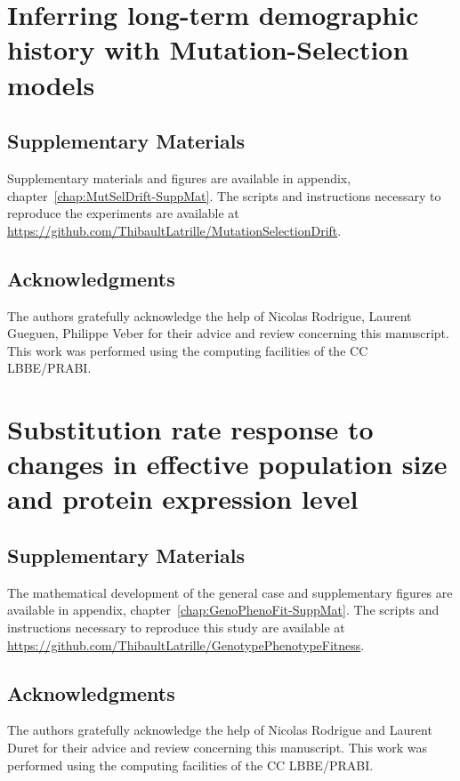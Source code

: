 \documentclass[a4paper,oneside,nobind]{thesis}
\begin{document}
\chapter[Inferring long-term population size] {Inferring long-term demographic history with Mutation-Selection models}
{\hypersetup{linkcolor=GREYDARK}\minitoc}
\label{chap:MutSelDrift}


\section{Supplementary Materials}
Supplementary materials and figures are available in appendix, chapter~\ref{chap:MutSelDrift-SuppMat}.
The scripts and instructions necessary to reproduce the experiments are available at \url{https://github.com/ThibaultLatrille/MutationSelectionDrift}.

\section{Acknowledgments}
The authors gratefully acknowledge the help of Nicolas Rodrigue, Laurent Gueguen, Philippe Veber for their advice and review concerning this manuscript.
This work was performed using the computing facilities of the CC LBBE/PRABI.

\thispagestyle{empty}
\chapter[Substitution rate susceptibility]{Substitution rate response to changes in effective population size and protein expression level}
{\hypersetup{linkcolor=GREYDARK}\minitoc}
\label{chap:GenoPhenoFit}


\section{Supplementary Materials}
The mathematical development of the general case and supplementary figures are available in appendix, chapter~\ref{chap:GenoPhenoFit-SuppMat}.
The scripts and instructions necessary to reproduce this study are available at \url{https://github.com/ThibaultLatrille/GenotypePhenotypeFitness}.

\section{Acknowledgments}
The authors gratefully acknowledge the help of Nicolas Rodrigue and Laurent Duret for their advice and review concerning this manuscript.
This work was performed using the computing facilities of the CC LBBE/PRABI.
\end{document}
